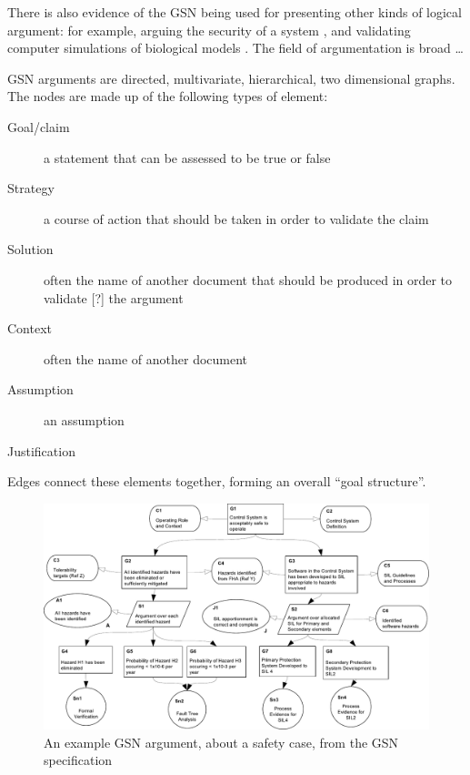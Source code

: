 There is also evidence of the GSN being used for presenting other kinds of logical argument:
for example,
arguing the security of a system \cite{plop},
and validating computer simulations of biological models \cite{insilico}  \cite{royal}. The field of argumentation is broad \ldots {}

GSN arguments are directed, multivariate, hierarchical, two dimensional graphs.
The nodes are made up of the following types of element:

\begin{description}

  \item[ Goal/claim ]
    a statement that can be assessed to be true or false

  \item[ Strategy]
    a course of action that should be taken in order to validate the claim
  
  \item[ Solution]
      often the name of another document that should be produced in order to validate [?] the argument 

  \item[ Context]
    often the name of another document

  \item[ Assumption]
    an assumption

  \item[ Justification]

\end{description}

Edges connect these elements together, forming an overall ``goal structure''. 

\begin{figure}
  \centering
  \includegraphics[width=\textwidth]{example_argument.pdf}
  \caption{An example GSN argument, about a safety case,
    from the GSN specification \cite{gsnstandard}}
  \label{fig:crampedex1}
\end{figure}




